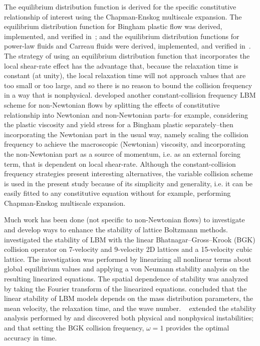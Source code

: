 \documentclass[pdftex,ms]{pittetd}
\begin{document}
The equilibrium distribution function is derived for the specific constitutive relationship of interest using the Chapman-Enskog multiscale expansion.
The equilibrium distribution function for Bingham plastic flow was derived, implemented, and verified in~\cite{wang2008lattice}; and the equilibrium distribution functions for power-law fluids and Carreau fluids were derived, implemented, and verified in~\cite{yoshino2007numerical}.
The strategy of using an equilibrium distribution function that incorporates the local shear-rate effect has the advantage that, because the relaxation time is constant (at unity), the local relaxation time will not approach values that are too small or too large, and so there is no reason to bound the collision frequency in a way that is nonphysical.
\citet{wang2011lattice} developed another constant-collision frequency LBM scheme for non-Newtonian flows by splitting the effects of constitutive relationship into Newtonian and non-Newtonian parts--for example, considering the plastic viscosity and yield stress for a Bingham plastic separately--then incorporating the Newtonian part in the usual way, namely scaling the collision frequency to achieve the macroscopic (Newtonian) viscosity, and incorporating the non-Newtonian part as a source of momentum, i.e. as an external forcing term, that is dependent on local shear-rate.
Although the constant-collision frequency strategies present interesting alternatives, the variable collision scheme is used in the present study because of its simplicity and generality, i.e. it can be easily fitted to any constitutive equation without for example, performing Chapman-Enskog multiscale expansion.

Much work has been done (not specific to non-Newtonian flows) to investigate and develop ways to enhance the stability of lattice Boltzmann methods.
\citet{sterling1993stability,sterling1996stability} investigated the stability of LBM with the linear Bhatnagar--Gross--Krook (BGK) collision operator on 7-velocity and 9-velocity 2D lattices and a 15-velocity cubic lattice.
The investigation was performed by linearizing all nonlinear terms about global equilibrium values and applying a von Neumann stability analysis on the resulting linearized equations.
The spatial dependence of stability was analyzed by taking the Fourier transform of the linearized equations.
\citeauthor{sterling1993stability} concluded that the linear stability of LBM models depends on the mass distribution parameters, the mean velocity, the relaxation time, and the wave number.
~\citet{worthing1997stability} extended the stability analysis performed by \citeauthor{sterling1993stability} and discovered both physical and nonphysical instabilities; and that setting the BGK collision frequency, $\omega = 1$ provides the optimal accuracy in time.
\end{document}
